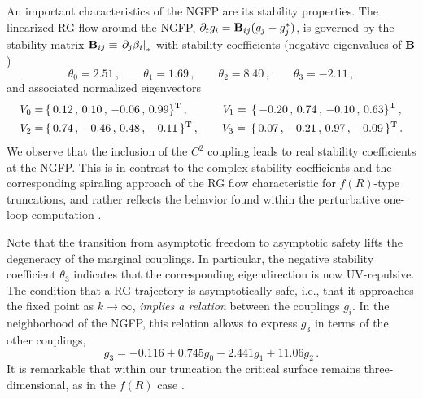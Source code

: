\documentclass[11pt,reqno]{article}
\newcommand{\be}{\begin{equation}}
\newcommand{\ee}{\end{equation}}
\newcommand{\2}{\sqrt{2\,}}
\newcommand{\p}{\partial}
\begin{document}
An important characteristics of the NGFP are its stability properties.
The linearized RG flow around the NGFP, $\p_t g_i = {\bf B}_{ij} (g_j - g^*_j)$, is 
governed by the stability matrix ${\bf B}_{ij} \equiv \left. \p_j \beta_i \right|_{*}$ with stability coefficients (negative eigenvalues of $\bf B$)
%
\be\label{stab:coeff}
\theta_0 = 2.51  \, , \qquad  \theta_1 = 1.69 \, , \qquad
\theta_2 = 8.40  \, , \qquad  \theta_3 =  -2.11 \,  ,
\ee
%
and associated normalized eigenvectors
%
\be
\begin{split}
V_0 = & \, \{ \, 0.12 \, , \, 0.10 \,  , \,  -0.06 \, , \,   0.99  \}^{\rm T} \, ,%
\quad \qquad V_1 =  \, \{ \, -0.20\, , \, 0.74 \,  ,  \, -0.10 \, , \,   0.63  \}^{\rm T} \, ,\\
V_2 = & \, \{ \, 0.74 \, , \, -0.46 \, , \, 0.48 \, , \, -0.11 \, \}^{\rm T} \, , %
\qquad V_3 =  \, \{ \, 0.07 \, , \, -0.21 \, , \, 0.97 \, , \, -0.09 \, \}^{\rm T} \, .
\end{split}
\ee
%
We observe that the inclusion of the $C^2$ coupling leads to real stability
coefficients at the NGFP. This is in contrast to the complex stability
coefficients and the corresponding spiraling approach of the RG flow
characteristic for $f(R)$-type truncations, and rather reflects the behavior
found within the perturbative one-loop computation \cite{Codello:2006in}.

Note that the transition from asymptotic freedom to asymptotic safety lifts the degeneracy of the marginal couplings. In particular, the negative stability coefficient $\theta_3$ indicates that the corresponding eigendirection is now UV-repulsive. The condition that a 
RG trajectory is asymptotically safe, i.e., that it approaches the fixed point as $k \rightarrow \infty$,
{\it implies a relation} between the couplings $g_i$. In the neighborhood of the NGFP, this relation allows to express $g_3$ in terms of the other couplings,
%
\be\label{critsurface}
g_3 = -0.116 + 0.745 g_0 - 2.441 g_1 + 11.06 g_2 \, .
\ee
%
It is remarkable that within our truncation the critical surface remains three-dimensional, as in the $f(R)$ case \cite{CPR:2008,MS:2008,CPR2:2008}.
\end{document}
